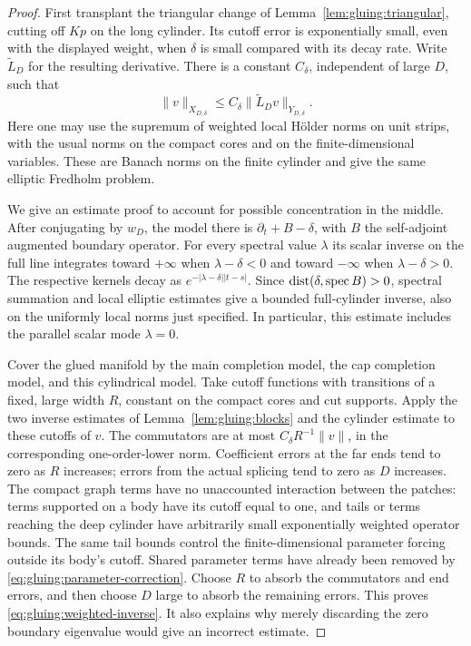 \begin{proof}
First transplant the triangular change of
Lemma~\ref{lem:gluing:triangular}, cutting off $Kp$ on the long
cylinder.  Its cutoff error is exponentially small, even with
the displayed weight, when $\delta$ is small compared with its
decay rate.  Write $\widetilde L_D$ for the resulting derivative.
There is a constant $C_\delta$, independent of large $D$, such that
\begin{equation}
 \|v\|_{X_{D,\delta}}
 \le C_\delta\|\widetilde L_Dv\|_{Y_{D,\delta}}.
 \label{eq:gluing:weighted-inverse}
\end{equation}
Here one may use the supremum of weighted local H\"older norms on
unit strips, with the usual norms on the compact cores and on the
finite-dimensional variables.  These are Banach norms on the
finite cylinder and give the same elliptic Fredholm problem.

We give an estimate proof to account for possible concentration in
the middle.  After conjugating by $w_D$, the model there is
$\partial_t+B-\delta$, with $B$ the self-adjoint augmented boundary
operator.  For every spectral value $\lambda$ its scalar inverse
on the full line integrates toward $+\infty$ when
$\lambda-\delta<0$ and toward $-\infty$ when
$\lambda-\delta>0$.  The respective kernels decay as
$e^{-|\lambda-\delta||t-s|}$.
Since $\operatorname{dist}(\delta,\operatorname{spec}B)>0$, spectral summation
and local elliptic estimates give a bounded full-cylinder inverse,
also on the uniformly local norms just specified.  In particular,
this estimate includes the parallel scalar mode $\lambda=0$.

Cover the glued manifold by the main completion model, the cap
completion model, and this cylindrical model.  Take cutoff
functions with transitions of a fixed, large width $R$, constant
on the compact cores and cut supports.  Apply the two inverse
estimates of Lemma~\ref{lem:gluing:blocks} and the cylinder estimate
to these cutoffs of $v$.  The commutators are at most
$C_\delta R^{-1}\|v\|$, in the corresponding one-order-lower norm.
Coefficient errors at the far ends tend to zero as $R$ increases;
errors from the actual splicing tend to zero as $D$ increases.
The compact graph terms have no unaccounted interaction between
the patches: terms supported on a body have its cutoff equal to
one, and tails or terms reaching the deep cylinder have arbitrarily
small exponentially weighted operator bounds.  The same tail
bounds control the finite-dimensional parameter forcing outside
its body's cutoff.  Shared parameter
terms have already been removed by
\eqref{eq:gluing:parameter-correction}.  Choose $R$ to absorb the
commutators and end errors, and then choose $D$ large to absorb the
remaining errors.  This proves
\eqref{eq:gluing:weighted-inverse}.  It also explains why merely
discarding the zero boundary eigenvalue would give an incorrect
estimate.


\end{proof}
